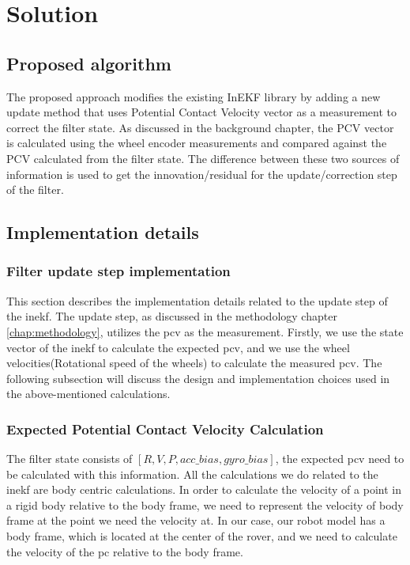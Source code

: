 \documentclass[report.tex]{subfiles}
\begin{document}
    \chapter{Solution}

    \section{Proposed algorithm}
        
        The proposed approach modifies the existing InEKF library by adding a new update method that uses Potential Contact Velocity vector as a measurement to correct the filter state. As discussed in the background chapter, the PCV vector is calculated using the wheel encoder measurements and compared against the PCV calculated from the filter state. The difference between these two sources of information is used to get the innovation/residual for the update/correction step of the filter. 

    \section{Implementation details}
    
    \subsection{Filter update step implementation}
    
        This section describes the implementation details related to the update step of the \gls{inekf}. The update step, as discussed in the methodology chapter \ref{chap:methodology}, utilizes the \gls{pcv} as the measurement. Firstly, we use the state vector of the \gls{inekf} to calculate the expected \gls{pcv}, and we use the wheel velocities(Rotational speed of the wheels) to calculate the measured \gls{pcv}. The following subsection will discuss the design and implementation choices used in the above-mentioned calculations.
    
    \subsection{Expected Potential Contact Velocity Calculation}
        
        The filter state consists of $[R, V, P, acc\_bias, gyro\_bias]$, the expected \gls{pcv} need to be calculated with this information. All the calculations we do related to the \gls{inekf} are  body centric calculations. In order to calculate the velocity of a point in a rigid body relative to the body frame, we need to represent the velocity of body frame at the point we need the velocity at. In our case, our robot model has a body frame, which is located at the center of the rover, and we need to calculate the velocity of the \gls{pc} relative to the body frame. 
        
\end{document}
